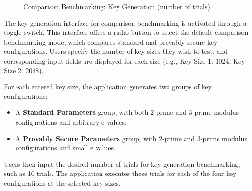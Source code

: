 \documentclass[]{final_report}
\theoremstyle{definition}
\begin{document}
\begin{figure}[H]
     \begin{minipage}{0.55\textwidth}
        \centering
        \caption{Comparison Benchmarking: Key Generation (number of trials)}
        \label{fig:image2}
    \end{minipage}
\end{figure}
The key generation interface for comparison benchmarking is activated through a toggle switch. This interface offers a radio button to select the default comparison benchmarking mode, which compares standard and provably secure key configurations. Users specify the number of key sizes they wish to test, and corresponding input fields are displayed for each size (e.g., Key Size 1: 1024, Key Size 2: 2048).

For each entered key size, the application generates two groups of key configurations:
\begin{itemize}
    \item A \textbf{Standard Parameters} group, with both 2-prime and 3-prime modulus configurations and arbitrary e values.
    \item A \textbf{Provably Secure Parameters} group, with 2-prime and 3-prime modulus configurations and small e values.
\end{itemize}

Users then input the desired number of trials for key generation benchmarking, such as 10 trials. The application executes these trials for each of the four key configurations at the selected key sizes.
\end{document}
